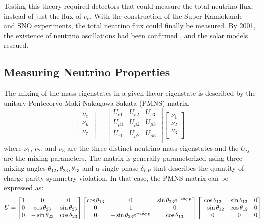 Testing this theory required detectors that could measure the total neutrino flux, instead of just the flux of $\nu_e$. With the construction of the Super-Kamiokande and SNO experiments, the total neutrino flux could finally be measured. By 2001, the existence of neutrino oscillations had been confirmed \cite{SuperK1998} \cite{SNO2001}, and the solar models rescued. 

\subsection{Measuring Neutrino Properties}
The mixing of the mass eigenstates in a given flavor eigenstate is described by the unitary Pontecorvo-Maki-Nakagawa-Sakata (PMNS) matrix, 
\begin{equation}
\begin{bmatrix}
\nu_e\\
\nu_\mu\\
\nu_\tau\\
\end{bmatrix}
=
\begin{bmatrix}
U_{e1} & U_{e2} & U_{e3} \\ 
U_{\mu1} & U_{\mu2} & U_{\mu3} \\ 
U_{\tau1} & U_{\mu2} & U_{\mu3} \\ 
\end{bmatrix}
\begin{bmatrix}
\nu_1\\
\nu_2\\
\nu_3\\
\end{bmatrix}
\label{eqn:PMNS}
\end{equation}
where $\nu_1$, $\nu_2$, and $\nu_3$ are the three distinct neutrino mass eigenstates and the $U_{ij}$ are the mixing parameters. The matrix is generally parameterized using three mixing angles $\theta_{12}, \theta_{23}, \theta_{13}$ and a single phase $\delta_{CP}$ that describes the quantity of charge-parity symmetry violation. In that case, the PMNS matrix can be expressed as:
\begin{equation}
U = 
\begin{bmatrix}
1 & 0 & 0 \\ 
0 & \cos\theta_{23} &\sin\theta_{23} \\ 
0 & -\sin\theta_{23} & \cos\theta_{23} \\ 
\end{bmatrix}
\begin{bmatrix}
\cos\theta_{13}  & 0 & \sin\theta_{23}e^{-i\delta_{CP}} \\ 
0 & 1 & 0 \\ 
0 & -\sin\theta_{23}e^{-i\delta_{CP}} & \cos\theta_{13} \\ 
\end{bmatrix}
\begin{bmatrix}
\cos\theta_{12}  & \sin\theta_{12} & 0  \\ 
-\sin\theta_{12} & \cos\theta_{12} & 0 \\ 
0 & 0 & 0 \\ 
\end{bmatrix}
\hspace{-10pt}
\label{eqn:PMNS_angle}
\end{equation}
